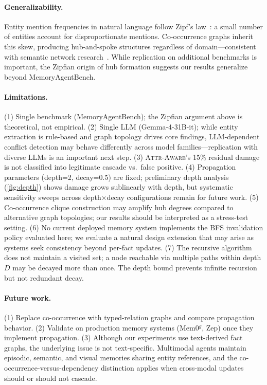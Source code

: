 \documentclass{article}
\newcommand{\attraware}{\textsc{Attr-Aware}}
\begin{document}
\paragraph{Generalizability.}
Entity mention frequencies in natural language follow Zipf's law~\citep{zipf_1949}: a small number of entities account for disproportionate mentions.
Co-occurrence graphs inherit this skew, producing hub-and-spoke structures regardless of domain---consistent with semantic network research~\citep{steyvers_semantic_2005, barabasi_scalefree_1999}.
While replication on additional benchmarks is important, the Zipfian origin of hub formation suggests our results generalize beyond MemoryAgentBench.

\paragraph{Limitations.}
(1) Single benchmark (MemoryAgentBench); the Zipfian argument above is theoretical, not empirical.
(2) Single LLM (Gemma-4-31B-it); while entity extraction is rule-based and graph topology drives core findings, LLM-dependent conflict detection may behave differently across model families---replication with diverse LLMs is an important next step.
(3) \attraware{}'s 15\% residual damage is not classified into legitimate cascade vs.\ false positive.
(4) Propagation parameters (depth=2, decay=0.5) are fixed; preliminary depth analysis (\cref{fig:depth}) shows damage grows sublinearly with depth, but systematic sensitivity sweeps across depth$\times$decay configurations remain for future work.
(5) Co-occurrence clique construction may amplify hub degrees compared to alternative graph topologies; our results should be interpreted as a stress-test setting.
(6) No current deployed memory system implements the BFS invalidation policy evaluated here; we evaluate a natural design extension that may arise as systems seek consistency beyond per-fact updates.
(7) The recursive algorithm does not maintain a visited set; a node reachable via multiple paths within depth $D$ may be decayed more than once. The depth bound prevents infinite recursion but not redundant decay.

\paragraph{Future work.}
(1) Replace co-occurrence with typed-relation graphs and compare propagation behavior.
(2) Validate on production memory systems (Mem0$^g$, Zep) once they implement propagation.
(3) Although our experiments use text-derived fact graphs, the underlying issue is not text-specific.
Multimodal agents maintain episodic, semantic, and visual memories sharing entity references, and the co-occurrence-versus-dependency distinction applies when cross-modal updates should or should not cascade.
\end{document}
